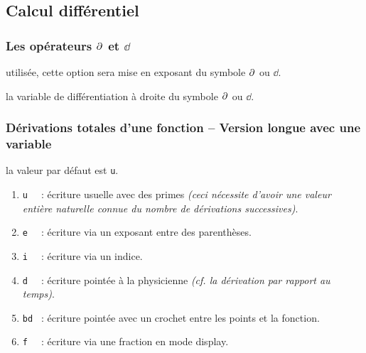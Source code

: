 \documentclass[12pt,a4paper]{book}
\theoremstyle{definition}
\begin{document}
{{\subsection{Calcul différentiel}

\subsubsection{\texorpdfstring{Les opérateurs $\pp{}$ et $\dd{}$}%
                           {Les opérateurs "d rond" et "d droit"}}





\IDoption{} utilisée, cette option sera mise en exposant du symbole $\pp{}$ ou $\dd{}$.

\IDarg{} la variable de différentiation à droite du symbole $\pp{}$ ou $\dd{}$.




\subsubsection{Dérivations totales d'une fonction -- Version longue avec une variable}




\IDoption{} la valeur par défaut est \verb+u+. 
\begin{enumerate}
	\item \verb+u  + : écriture usuelle avec des primes \emph{(ceci nécessite d'avoir une valeur entière naturelle connue du nombre de dérivations successives)}.

	\item \verb+e  + : écriture via un exposant entre des parenthèses.
	
	\item \verb+i  + : écriture via un indice.

	\item \verb+d  + : écriture pointée à la physicienne \emph{(cf. la dérivation par rapport au temps)}.

	\item \verb+bd + : écriture pointée avec un crochet entre les points et la fonction.

	\medskip
	
	\item \verb+f  + : écriture via une fraction en mode display.


\end{enumerate}}}
\end{document}
